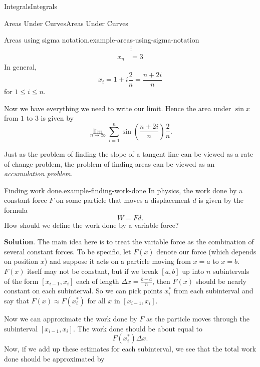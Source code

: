 \documentclass[10pt,]{book}
\numberwithin{equation}{section}
\begin{document}
\begin{chapterptx}{Integrals}{}{Integrals}{}{}
\begin{sectionptx}{Areas Under Curves}{}{Areas Under Curves}{}{}
\begin{example}{Areas using sigma notation.}{example-areas-using-sigma-notation}
\begin{align*}
& \vdots \\
x_{n} & = 3 
\end{align*}
In general,%
\begin{equation*}
x_{i} = 1 + i\frac{2}{n} = \frac{n+2i}{n}
\end{equation*}
for \(1\leq i\leq n\).%
\par
\hypertarget{p-419}{}%
Now we have everything we need to write our limit. Hence the area under \(\sin x\) from \(1\) to \(3\) is given by%
\begin{equation*}
\lim_{n\to\infty}\sum_{i=1}^{n}\sin\left(\frac{n+2i}{n}\right)\frac{2}{n}.
\end{equation*}
%
\end{example}
\hypertarget{p-420}{}%
Just as the problem of finding the slope of a tangent line can be viewed as a rate of change problem, the problem of finding areas can be viewed as an \emph{accumulation problem}.%
\begin{example}{Finding work done.}{example-finding-work-done}%
\hypertarget{p-421}{}%
In physics, the work done by a constant force \(F\) on some particle that moves a displacement \(d\) is given by the formula%
\begin{equation*}
W = Fd.
\end{equation*}
How should we define the work done by a variable force?%
\par\smallskip%
\noindent\textbf{Solution}.\hypertarget{solution-93}{}\quad%
\hypertarget{p-422}{}%
The main idea here is to treat the variable force as the combination of several constant forces. To be specific, let \(F(x)\) denote our force (which depends on position \(x\)) and suppose it acts on a particle moving from \(x=a\) to \(x=b\). \(F(x)\) itself may not be constant, but if we break \([a,b]\) up into \(n\) subintervals of the form \([x_{i-1},x_{i}]\) each of length \(\Delta x = \frac{b-a}{n}\), then \(F(x)\) should be nearly constant on each subinterval. So we can pick points \(x_{i}^{*}\) from each subinterval and say that \(F(x)\approx F(x_{i}^{*})\) for all \(x\) in \([x_{i-1},x_{i}]\).%
\par
\hypertarget{p-423}{}%
Now we can approximate the work done by \(F\) as the particle moves through the subinterval \([x_{i-1},x_{i}]\). The work done should be about equal to%
\begin{equation*}
F(x_{i}^{*})\Delta x\text{.}
\end{equation*}
Now, if we add up these estimates for each subinterval, we see that the total work done should be approximated by%

\end{example}
\end{sectionptx}
\end{chapterptx}
\end{document}
